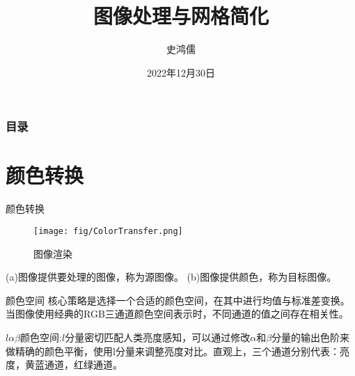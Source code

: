 \documentclass[10.5pt]{beamer}
\title{图像处理与网格简化}
\subtitle{}
\author{史鸿儒}
\date{2022年12月30日}
\begin{document}
\thispagestyle{empty}	%
\maketitle

	\begin{frame}           %
	\addtocounter{framenumber}{-2}%
	\frametitle{目录}
	\thispagestyle{empty}
	\tableofcontents        %
	\end{frame}




\section{颜色转换}
\begin{frame}{颜色转换}
\begin{figure}[!t]
\centering
\texttt{[image: fig/ColorTransfer.png]}
\caption{图像渲染}
\label{fig_1}
\end{figure}
(a)图像提供要处理的图像，称为源图像。
(b)图像提供颜色，称为目标图像。

\end{frame}

\begin{frame}{颜色空间}
核心策略是选择一个合适的颜色空间，在其中进行均值与标准差变换。
当图像使用经典的RGB三通道颜色空间表示时，不同通道的值之间存在相关性。


$l \alpha \beta$颜色空间:$l$分量密切匹配人类亮度感知，可以通过修改$\alpha$和$\beta$分量的输出色阶来做精确的颜色平衡，使用l分量来调整亮度对比。直观上，三个通道分别代表：亮度，黄蓝通道，红绿通道。

\end{frame}
\end{document}
